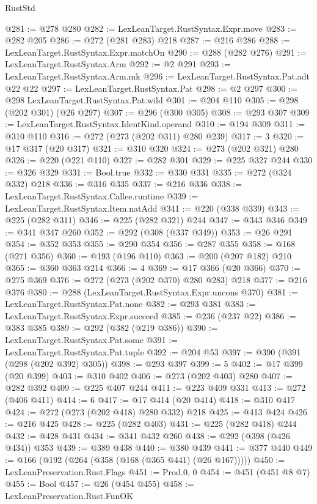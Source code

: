 \begin{lexlean}{RustStd}
\begin{coremodule}
@281 := @278 @280
@282 := LexLeanTarget.RustSyntax.Expr.move
@283 := @282 @205
@286 := @272 (@281 @283) @218
@287 := @216 @286
@288 := LexLeanTarget.RustSyntax.Expr.matchOn
@290 := @288 (@282 @276)
@291 := LexLeanTarget.RustSyntax.Arm
@292 := @2 @291
@293 := LexLeanTarget.RustSyntax.Arm.mk
@296 := LexLeanTarget.RustSyntax.Pat.adt @22 @22
@297 := LexLeanTarget.RustSyntax.Pat
@298 := @2 @297
@300 := @298 LexLeanTarget.RustSyntax.Pat.wild
@301 := @204 @110
@305 := @298 (@202 @301) (@26 @297)
@307 := @296 (@300 @305)
@308 := @293 @307
@309 := LexLeanTarget.RustSyntax.IdentKind.operand
@310 := @194 @309
@311 := @310 @110
@316 := @272 (@273 (@202 @311) @280 @239)
@317 := 3
@320 := @17 @317 (@20 @317)
@321 := @310 @320
@324 := @273 (@202 @321) @280
@326 := @220 (@221 @110)
@327 := @282 @301
@329 := @225 @327 @244
@330 := @326 @329
@331 := Bool.true
@332 := @330 @331
@335 := @272 (@324 @332) @218
@336 := @316 @335
@337 := @216 @336
@338 := LexLeanTarget.RustSyntax.Callee.runtime
@339 := LexLeanTarget.RustSyntax.Item.natAdd
@341 := @220 (@338 @339)
@343 := @225 (@282 @311)
@346 := @225 (@282 @321) @244
@347 := @343 @346
@349 := @341 @347 @260
@352 := @292 (@308 (@337 @349))
@353 := @26 @291
@354 := @352 @353
@355 := @290 @354
@356 := @287 @355
@358 := @168 (@271 @356)
@360 := @193 (@196 @110)
@363 := @200 (@207 @182) @210
@365 := @360 @363 @214
@366 := 4
@369 := @17 @366 (@20 @366)
@370 := @275 @369
@376 := @272 (@273 (@202 @370) @280 @283) @218
@377 := @216 @376
@380 := @288 (LexLeanTarget.RustSyntax.Expr.uncons @370)
@381 := LexLeanTarget.RustSyntax.Pat.none
@382 := @293 @381
@383 := LexLeanTarget.RustSyntax.Expr.succeed
@385 := @236 (@237 @22)
@386 := @383 @385
@389 := @292 (@382 (@219 @386))
@390 := LexLeanTarget.RustSyntax.Pat.some
@391 := LexLeanTarget.RustSyntax.Pat.tuple
@392 := @204 @53
@397 := @390 (@391 (@298 (@202 @392) @305))
@398 := @293 @397
@399 := 5
@402 := @17 @399 (@20 @399)
@403 := @310 @402
@406 := @273 (@202 @403) @280
@407 := @282 @392
@409 := @225 @407 @244
@411 := @223 @409 @331
@413 := @272 (@406 @411)
@414 := 6
@417 := @17 @414 (@20 @414)
@418 := @310 @417
@424 := @272 (@273 (@202 @418) @280 @332) @218
@425 := @413 @424
@426 := @216 @425
@428 := @225 (@282 @403)
@431 := @225 (@282 @418) @244
@432 := @428 @431
@434 := @341 @432 @260
@438 := @292 (@398 (@426 @434)) @353
@439 := @389 @438
@440 := @380 @439
@441 := @377 @440
@449 := @166 (@192 (@264 (@358 (@168 (@365 @441) (@26 @167)))))
@450 := LexLeanPreservation.Rust.Flags
@451 := Prod.{0, 0}
@454 := @451 (@451 @8 @7)
@455 := Bool
@457 := @26 (@454 @455)
@458 := LexLeanPreservation.Rust.FunOK

\end{coremodule}
\end{lexlean}
